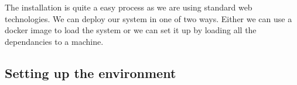 The installation is quite a easy process as we are using standard web technologies. We can deploy our system in one of two ways. Either we can use a docker image to load the system or we can set it up by loading all the dependancies to a machine.
\subsection{Setting up the environment}